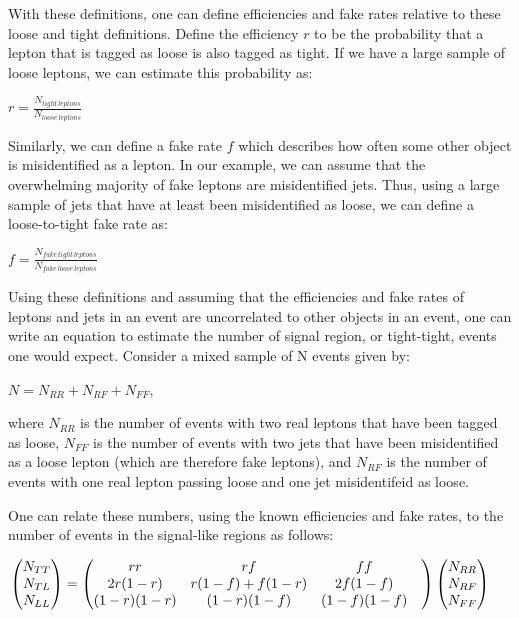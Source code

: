 With these definitions, one can define efficiencies and fake rates relative to these loose and tight definitions.
Define the efficiency $r$ to be the probability that a lepton that is tagged as loose is also tagged as tight.
If we have a large sample of loose leptons, we can estimate this probability as:

\begin{center}
$ r = \frac{N_{tight \, leptons} }{N_{loose \, leptons}}$ \\
\end{center}

Similarly, we can define a fake rate $f$ which describes how often some other object is misidentified as a lepton.
In our example, we can assume that the overwhelming majority of fake leptons are misidentified jets.
Thus, using a large sample of jets that have at least been misidentified as loose, we can define a loose-to-tight fake rate as:

\begin{center}
$ f = \frac{N_{fake \, tight \, leptons} }{ N_{fake \, loose \, leptons} } $ \\
\end{center}

Using these definitions and assuming that the efficiencies and fake rates of leptons and jets in an event are uncorrelated to other objects in an event, one can write an equation to estimate the number of signal region, or tight-tight, events one would expect.
Consider a mixed sample of N events given by:

$ N = N_{RR} + N_{RF} + N_{FF} $,

where $N_{RR}$ is the number of events with two real leptons that have been tagged as loose, $N_{FF}$ is the number of events with two jets that have been misidentified as a loose lepton (which are therefore fake leptons), and $N_{RF}$ is the number of events with one real lepton passing loose and one jet misidentifeid as loose.

One can relate these numbers, using the known efficiencies and fake rates, to the number of events in the signal-like regions as follows:


\begin{equation}
  \label{eqn:mm_matrix}
  \hspace{-0.5cm}
  \begin{pmatrix}N_{TT}\\N_{TL}\\N_{LL}\end{pmatrix} 
  = 
  \begin{pmatrix}rr& rf& ff\\ 2r(1-r)& r(1-f) + f(1-r)& 2f(1-f)\\ (1-r)(1-r) & (1-r)(1-f)& (1-f)(1-f)& \\\end{pmatrix}
  \begin{pmatrix}N_{RR}\\N_{RF}\\N_{FF}
  \end{pmatrix}
\end{equation}


